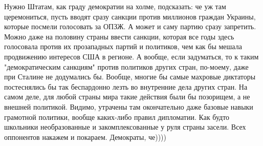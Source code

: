\begin{itemize}
Нужно Штатам, как граду демократии на холме, подсказать: че уж там
церемониться, пусть вводят сразу санкции против миллионов граждан Украины,
которые посмели голосовать за ОПЗЖ. А может и саму партию сразу запретить.
Можно даже на половину страны ввести санкции, которая все годы здесь голосовала
против их прозападных партий и политиков, чем как бы мешала продвижению
интересов США в регионе. А вообще, если задуматься, то к таким "демократическим
санкциям" против политиков других стран, по-моему, даже при Сталине не
додумались бы. Вообще, многие бы самые махровые диктаторы постеснялись бы так
беспардонно лезть во внутренние дела других стран. На самом деле, для любой
страны мира такие действия были бы позорищем, а не внешней политикой. Видимо,
утрачены там окончательно даже базовые навыки грамотной политики, вообще
каких-либо правил дипломатии. Как будто школьники необразованные и
закомплексованные у руля страны засели. Всех оппонентов накажем и покараем.
Демократы, че))))


\end{itemize} %
